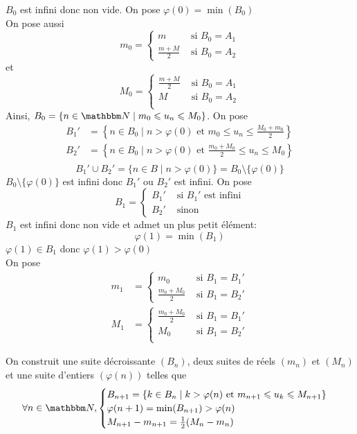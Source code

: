 \begin{prv}
\begin{itemize}
			$B_0$ est infini donc non vide. On pose $\varphi(0) = \min(B_0)$\\
			On pose aussi \[
			m_0 = \begin{cases}
				m &\text{ si } B_0=A_1 \\
				\frac{m+M}{2} &\text{ si } B_0=A_2
			\end{cases}
			\] et \[
			M_0 = \begin{cases}
				\frac{m+M}{2} &\text{ si } B_0 = A_1\\
				M &\text{ si } B_0 = A_2\\
			\end{cases}
			\]
			Ainsi, $B_0 = \{n\in \N \mid m_0\le u_n\le M_0\}$. On pose 
			\begin{align*}
				B_1'&= \left\{n\in B_0 \mid n > \varphi(0) \text{ et } m_0\le u_n \le \frac{M_0+m_0}{2}\right\} \\
				B_2'&= \left\{n\in B_0 \mid n > \varphi(0) \text{ et } \frac{m_0+M_0}{2} \le u_n \le M_0\right\} \\
			\end{align*}
			\[
			B_1'\cup B_2' = \{n\in B \mid n > \varphi(0)\} = B_0\setminus \{\varphi(0)\} 
			\]
			$B_0\setminus \{\varphi(0)\}$ est infini donc $B_1'$ ou $B_2'$ est infini. On pose \[
			B_1= \begin{cases}
				B_1' &\text{ si } B_1' \text{ est infini}\\
				B_2' &\text{ sinon}
			\end{cases}
			\] $B_1$ est infini donc non vide et admet un plus petit élément: \[
			\varphi(1) = \min(B_1)
			\]
			$\varphi(1) \in B_1$ donc $\varphi(1) > \varphi(0)$\\
			On pose
			\begin{align*}
				m_1&=\begin{cases}
					m_0 &\text{ si } B_1=B_1'\\
					\frac{m_0+M_0}{2} &\text{ si } B_1 = B_2'
				\end{cases}\\
				M_1 &= \begin{cases}
					\frac{m_0+M_0}2 &\text{ si } B_1=B_1'\\
					M_0 &\text{ si } B_1=B_2'\\
				\end{cases}
			\end{align*}

			On construit une suite décroissante $(B_n)$, deux suites de réels $(m_n)$ et $(M_n)$ et une suite d'entiers $(\varphi(n))$ telles que \[
			\forall n\in \N, \begin{cases}
				B_{n+1} = \{k\in B_n \mid k > \varphi(n) \text{ et } m_{n+1} \le  u_k \le M_{n+1}\} \\
				\varphi(n+1) = \min(B_{n+1}) > \varphi(n)\\
				M_{n+1} - m_{n+1} = \frac{1}{2}(M_n-m_n)
			\end{cases}
			\] 


\end{itemize}
\end{prv}
